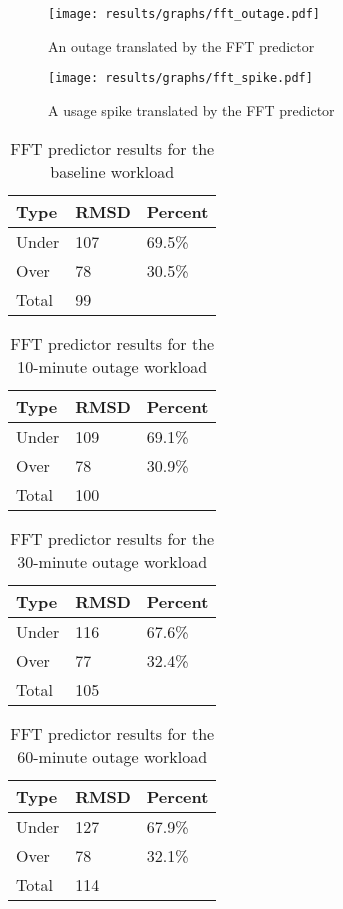 \begin{figure}
\centering
\texttt{[image: results/graphs/fft\_outage.pdf]}
\caption{An outage translated by the FFT predictor}
\label{fig:fft_outage}
\end{figure}

\begin{figure}
\centering
\texttt{[image: results/graphs/fft\_spike.pdf]}
\caption{A usage spike translated by the FFT predictor}
\label{fig:fft_spike}
\end{figure}

\begin{table}[H]
\centering
\begin{tabular}{| l | l | l |}
\hline
Type & RMSD & Percent \\ \hline
Under & 107 & 69.5\% \\ \hline
Over & 78 & 30.5\% \\ \hline
Total & 99 & \\ \hline
\end{tabular}
\caption{FFT predictor results for the baseline workload}
\end{table}


\begin{table}[H]
\centering
\begin{tabular}{| l | l | l |}
\hline
Type & RMSD & Percent \\ \hline
Under & 109 & 69.1\% \\ \hline
Over & 78 & 30.9\% \\ \hline
Total & 100 & \\ \hline
\end{tabular}
\caption{FFT predictor results for the 10-minute outage workload}
\end{table}

\begin{table}[H]
\centering
\begin{tabular}{| l | l | l |}
\hline
Type & RMSD & Percent \\ \hline
Under & 116 & 67.6\% \\ \hline
Over & 77 & 32.4\% \\ \hline
Total & 105 & \\ \hline
\end{tabular}
\caption{FFT predictor results for the 30-minute outage workload}
\end{table}

\begin{table}[H]
\centering
\begin{tabular}{| l | l | l |}
\hline
Type & RMSD & Percent \\ \hline
Under & 127 & 67.9\% \\ \hline
Over & 78 & 32.1\% \\ \hline
Total & 114 & \\ \hline
\end{tabular}
\caption{FFT predictor results for the 60-minute outage workload}
\end{table}

